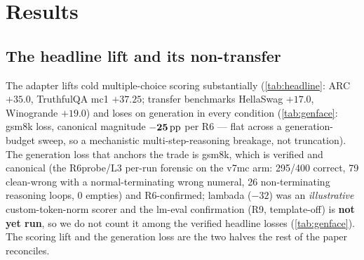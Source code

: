 \section{Results}\label{sec:results}

\subsection{The headline lift and its non-transfer}\label{results:headline}

The adapter lifts cold multiple-choice scoring substantially (\cref{tab:headline}:
ARC $+35.0$, TruthfulQA mc1 $+37.25$; transfer benchmarks HellaSwag $+17.0$,
Winogrande $+19.0$) and loses on generation in every condition (\cref{tab:genface}:
gsm8k loss, canonical magnitude $\mathbf{-25\,\mathrm{pp}}$ per R6 --- flat across a
generation-budget sweep, so a mechanistic multi-step-reasoning breakage, not
truncation). The generation loss that anchors the trade is gsm8k, which is verified
and canonical (the R6probe/L3 per-run forensic on the v7mc arm: 295/400 correct, 79
clean-wrong with a normal-terminating wrong \code{\#\#\#\#} numeral, 26
non-terminating reasoning loops, 0 empties) and R6-confirmed; lambada ($-32$) was an
\emph{illustrative} custom-token-norm scorer and the lm-eval confirmation (R9,
 template-off) is \textbf{not yet run}, so we do not count it
among the verified headline losses (\cref{tab:genface}). The scoring lift and the
generation loss are the two halves the rest of the paper reconciles.


